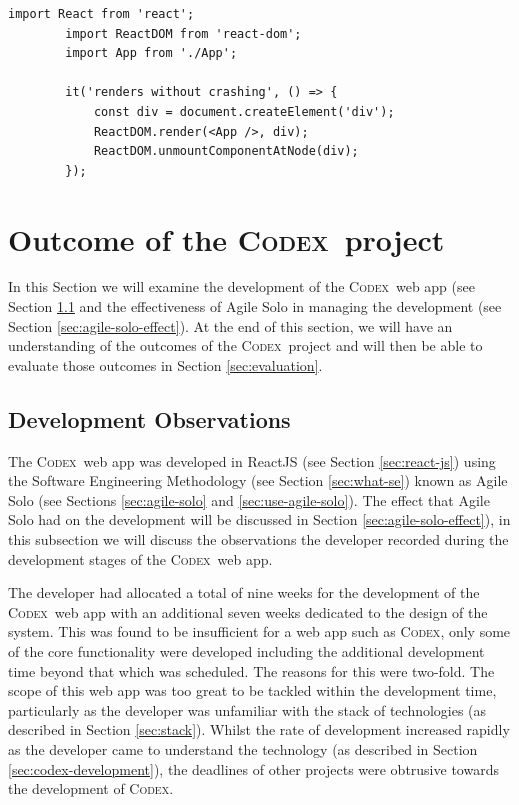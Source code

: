 \documentclass[final]{cmpreport}
\newcommand{\Codex}{\textsc{Codex}}
\begin{document}
		\begin{lstlisting}[caption={\Codex \ web app smoke test}, label={cod:smoke-test}]
		import React from 'react';
		import ReactDOM from 'react-dom';
		import App from './App';
		
		it('renders without crashing', () => {
			const div = document.createElement('div');
			ReactDOM.render(<App />, div);
			ReactDOM.unmountComponentAtNode(div);
		});
		\end{lstlisting}
	
	
	\section{Outcome of the \Codex \ project} \label{sec:outcomes}
	In this Section we will examine the development of the \Codex \ web app (see Section \ref{sec:dev-obs} and the effectiveness of Agile Solo in managing the development (see Section \ref{sec:agile-solo-effect}). At the end of this section, we will have an understanding of the outcomes of the \Codex \ project and will then be able to evaluate those outcomes in Section \ref{sec:evaluation}.
	
		\subsection{Development Observations} \label{sec:dev-obs}
		The \Codex \ web app was developed in ReactJS (see Section \ref{sec:react-js}) using the Software Engineering Methodology (see Section \ref{sec:what-se}) known as Agile Solo (see Sections \ref{sec:agile-solo} and \ref{sec:use-agile-solo}). The effect that Agile Solo had on the development will be discussed in Section \ref{sec:agile-solo-effect}), in this subsection we will discuss the observations the developer recorded during the development stages of the \Codex \ web app. 
		
		The developer had allocated a total of nine weeks for the development of the \Codex \ web app with an additional seven weeks dedicated to the design of the system. This was found to be insufficient for a web app such as \Codex, only some of the core functionality were developed including the additional development time beyond that which was scheduled. The reasons for this were two-fold. The scope of this web app was too great to be tackled within the development time, particularly as the developer was unfamiliar with the stack of technologies (as described in Section \ref{sec:stack}). Whilst the rate of development increased rapidly as the developer came to understand the technology (as described in Section \ref{sec:codex-development}), the deadlines of other projects were obtrusive towards the development of \Codex. 
		
\end{document}
